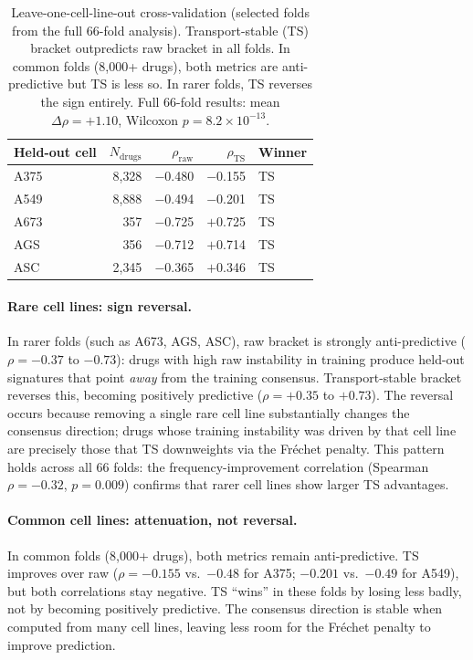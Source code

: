 \documentclass{article}
\begin{document}
\begin{table}[t]
\centering
\caption{Leave-one-cell-line-out cross-validation (selected folds from
the full 66-fold analysis). Transport-stable (TS) bracket outpredicts
raw bracket in all folds. In common folds (8{,}000+ drugs), both metrics
are anti-predictive but TS is less so. In rarer folds, TS reverses the
sign entirely. Full 66-fold results: mean $\Delta\rho = +1.10$,
Wilcoxon $p = 8.2 \times 10^{-13}$.}
\label{tab:transport}
\small
\begin{tabular}{lrrrl}
\toprule
Held-out cell & $N_{\text{drugs}}$ & $\rho_{\text{raw}}$ & $\rho_{\text{TS}}$ & Winner \\
\midrule
A375 & 8{,}328 & $-$0.480 & $-$0.155 & TS \\
A549 & 8{,}888 & $-$0.494 & $-$0.201 & TS \\
A673 & 357 & $-$0.725 & $+$0.725 & TS \\
AGS & 356 & $-$0.712 & $+$0.714 & TS \\
ASC & 2{,}345 & $-$0.365 & $+$0.346 & TS \\
\bottomrule
\end{tabular}
\end{table}

\paragraph{Rare cell lines: sign reversal.}
In rarer folds (such as A673, AGS, ASC), raw bracket is strongly
anti-predictive ($\rho = -0.37$ to $-0.73$): drugs with high raw
instability in training produce held-out signatures that point
\emph{away} from the training consensus. Transport-stable bracket
reverses this, becoming positively predictive ($\rho = +0.35$ to
$+0.73$). The reversal occurs because removing a single rare cell
line substantially changes the consensus direction; drugs whose
training instability was driven by that cell line are precisely those
that TS downweights via the Fr\'{e}chet penalty. This pattern holds
across all 66 folds: the frequency-improvement correlation (Spearman
$\rho = -0.32$, $p = 0.009$) confirms that rarer cell lines show
larger TS advantages.

\paragraph{Common cell lines: attenuation, not reversal.}
In common folds (8{,}000+ drugs), both metrics remain
anti-predictive. TS improves over raw ($\rho = -0.155$ vs.\ $-0.48$ for
A375; $-0.201$ vs.\ $-0.49$ for A549), but both correlations stay
negative. TS ``wins'' in these folds by losing less badly, not by becoming
positively predictive. The consensus direction is stable when computed from
many cell lines, leaving less room for the Fr\'{e}chet penalty to
improve prediction.
\end{document}
